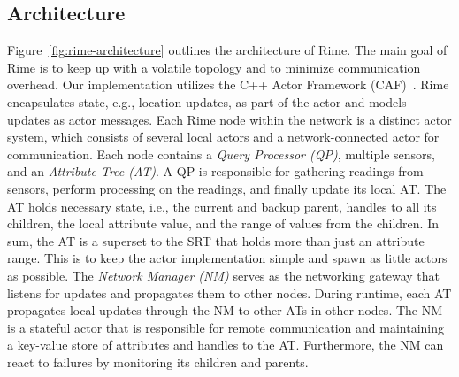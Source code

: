 \subsection{Architecture}
\label{subsec:architecture}
Figure~\ref{fig:rime-architecture} outlines the architecture of Rime.
The main goal of Rime is to keep up with a volatile topology and to minimize communication overhead.
Our implementation utilizes the C++ Actor Framework (CAF)~\cite{charousset_native_2013}. 
Rime encapsulates state, e.g., location updates, as part of the actor and models updates as actor messages.
Each Rime node within the network is a distinct actor system, which consists of several local actors and a network-connected actor for communication.
Each node contains a \textit{Query Processor (QP)}, multiple sensors, and an \textit{Attribute Tree (AT)}.
% 
A QP is responsible for gathering readings from sensors, perform processing on the readings, and finally update its local AT.
%
The AT holds necessary state, i.e., the current and backup parent, handles to all its children, the local attribute value, and the range of values from the children. In sum, the AT is a superset to the SRT that holds more than just an attribute range. This is to keep the actor implementation simple and spawn as little actors as possible. 
%
The \textit{Network Manager (NM)} serves as the networking gateway that listens for updates and propagates them to other nodes.
During runtime, each AT propagates local updates through the NM to other ATs in other nodes. 
The NM is a stateful actor that is responsible for remote communication and maintaining a key-value store of attributes and handles to the AT.
% 
Furthermore, the NM can react to failures by  monitoring its children and parents. 


